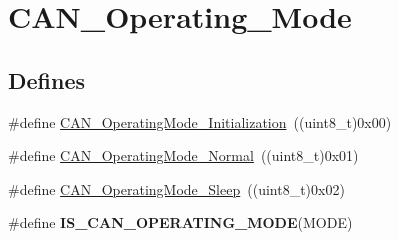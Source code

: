 \hypertarget{group__CAN__Operating__Mode}{
\section{CAN\_\-Operating\_\-Mode}
\label{group__CAN__Operating__Mode}
}
\subsection*{Defines}
\begin{DoxyCompactItemize}
\item 
\#define \hyperlink{group__CAN__Operating__Mode_gace8a4b5c164aba6f473d6254ad1e8a36}{CAN\_\-OperatingMode\_\-Initialization}~((uint8\_\-t)0x00)
\item 
\#define \hyperlink{group__CAN__Operating__Mode_ga663ecffaa60d1a201a035dfa45325848}{CAN\_\-OperatingMode\_\-Normal}~((uint8\_\-t)0x01)
\item 
\#define \hyperlink{group__CAN__Operating__Mode_ga173b85d2baaa6249d966b8073e3ad8ca}{CAN\_\-OperatingMode\_\-Sleep}~((uint8\_\-t)0x02)
\item 
\#define {\bfseries IS\_\-CAN\_\-OPERATING\_\-MODE}(MODE)
\end{DoxyCompactItemize}



